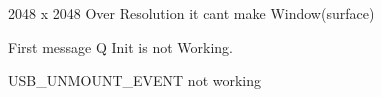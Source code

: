 
\begin{DoxyRefList}
\item[\label{bug__bug000003}%
\Hypertarget{bug__bug000003}%
File \hyperlink{SN__MODULE__IMAGE__VIEWER_8c}{S\+N\+\_\+\+M\+O\+D\+U\+L\+E\+\_\+\+I\+M\+A\+G\+E\+\_\+\+V\+I\+E\+W\+ER.c} ]2048 x 2048 Over Resolution it can\textquotesingle{}t make Window(surface)  
\item[\label{bug__bug000001}%
\Hypertarget{bug__bug000001}%
Member \hyperlink{group__SYSTEM__MESSAGE__Q_ga35e9ff084626dfccd36d098827638a0c}{S\+N\+\_\+\+S\+Y\+S\+\_\+\+Message\+Q\+Init} (sys\+Message\+Q\+Id $\ast$msg\+Q\+Id)]First message Q Init is not Working.  
\item[\label{bug__bug000002}%
\Hypertarget{bug__bug000002}%
File \hyperlink{SN__SYS__USB__DRIVER_8c}{S\+N\+\_\+\+S\+Y\+S\+\_\+\+U\+S\+B\+\_\+\+D\+R\+I\+V\+ER.c} ]U\+S\+B\+\_\+\+U\+N\+M\+O\+U\+N\+T\+\_\+\+E\+V\+E\+NT not working 
\end{DoxyRefList}